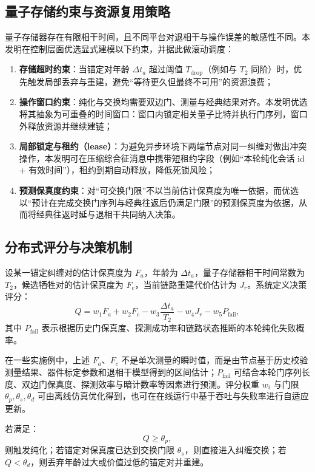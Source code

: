 \documentclass[12pt,a4paper]{article}
\begin{document}
\subsection{量子存储约束与资源复用策略}

量子存储器存在有限相干时间，且不同平台对退相干与操作误差的敏感性不同。本发明在控制层面优选显式建模以下约束，并据此做滚动调度：
\begin{enumerate}[label=(\arabic*)]
    \item \textbf{存储超时约束}：当锚定对年龄 $\Delta t_a$ 超过阈值 $T_{\mathrm{drop}}$（例如与 $T_2$ 同阶）时，优先触发局部丢弃与重建，避免“等待更久但最终不可用”的资源浪费；
    \item \textbf{操作窗口约束}：纯化与交换均需要双边门、测量与经典结果对齐。本发明优选将其抽象为可重叠的时间窗口：窗口内锁定相关量子比特并执行门序列，窗口外释放资源并继续建链；
    \item \textbf{局部锁定与租约（lease）}：为避免异步环境下两端节点对同一纠缠对做出冲突操作，本发明可在压缩综合征消息中携带短租约字段（例如“本轮纯化会话 id + 有效时间”），租约到期自动释放，降低死锁风险；
    \item \textbf{预测保真度约束}：对“可交换门限”不以当前估计保真度为唯一依据，而优选以“预计在完成交换门序列与经典往返后仍满足门限”的预测保真度为依据，从而将经典往返时延与退相干共同纳入决策。
\end{enumerate}

\subsection{分布式评分与决策机制}

设某一锚定纠缠对的估计保真度为 $F_a$，年龄为 $\Delta t_a$，量子存储器相干时间常数为 $T_2$，候选牺牲对的估计保真度为 $F_c$，当前链路重建代价估计为 $J_r$。系统定义决策评分：
\[
Q = w_1 F_a + w_2 F_c - w_3 \frac{\Delta t_a}{T_2} - w_4 J_r - w_5 P_{\mathrm{fail}},
\]
其中 $P_{\mathrm{fail}}$ 表示根据历史门保真度、探测成功率和链路状态推断的本轮纯化失败概率。

在一些实施例中，上述 $F_a$、$F_c$ 不是单次测量的瞬时值，而是由节点基于历史校验测量结果、器件标定参数和退相干模型得到的区间估计；$P_{\mathrm{fail}}$ 可结合本轮门序列长度、双边门保真度、探测效率与暗计数率等因素进行预测。评分权重 $w_i$ 与门限 $\theta_p,\theta_s,\theta_d$ 可由离线仿真优化得到，也可在在线运行中基于吞吐与失败率进行自适应更新。

若满足：
\[
Q \ge \theta_p,
\]
则触发纯化；若锚定对保真度已达到交换门限 $\theta_s$，则直接进入纠缠交换；若 $Q < \theta_d$，则丢弃年龄过大或价值过低的锚定对并重建。
\end{document}
